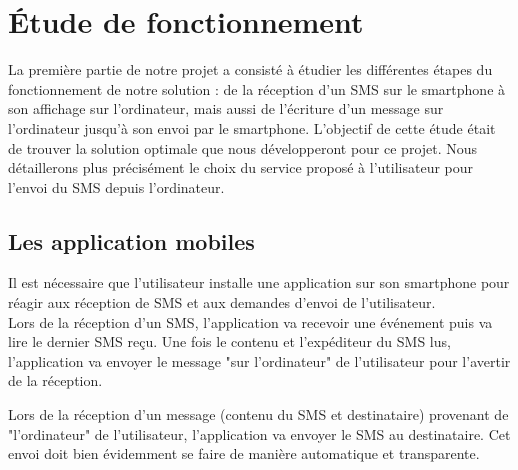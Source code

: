 \cleardoublepage



\chapter{Étude de fonctionnement}

La première partie de notre projet a consisté à étudier les différentes étapes du fonctionnement de notre solution : de la réception d'un SMS sur le smartphone à son affichage sur l'ordinateur, mais aussi de l'écriture d'un message sur l'ordinateur jusqu'à son envoi par le smartphone.
L'objectif de cette étude était de trouver la solution optimale que nous développeront pour ce projet.
Nous détaillerons plus précisément le choix du service proposé à l'utilisateur pour l'envoi du SMS depuis l'ordinateur.






\section{Les application mobiles}

Il est nécessaire que l'utilisateur installe une application sur son smartphone pour réagir aux réception de SMS et aux demandes d'envoi de l'utilisateur.
\\


Lors de la réception d'un SMS, l'application va recevoir une événement puis va lire le dernier SMS reçu.
Une fois le contenu et l'expéditeur du SMS lus, l'application va envoyer le message "sur l'ordinateur" de l'utilisateur pour l'avertir de la réception.

Lors de la réception d'un message (contenu du SMS et destinataire) provenant de "l'ordinateur" de l'utilisateur, l'application va envoyer le SMS au destinataire.
Cet envoi doit bien évidemment se faire de manière automatique et transparente.

